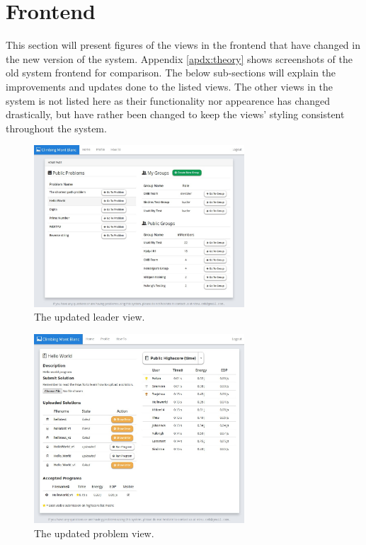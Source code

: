 \section{Frontend}
\label{sec:impr-frontend}
This section will present figures of the views in the frontend that have changed in the new version of the system. Appendix \ref{apdx:theory} shows screenshots of the old system frontend for comparison. The below sub-sections will explain the improvements and updates done to the listed views. The other views in the system is not listed here as their functionality nor appearence has changed drastically, but have rather been changed to keep the views' styling consistent throughout the system.

\begin{figure}[h!]
    \centering
    \includegraphics[width=0.7\textwidth]{figs/new_homepage.jpg}
    \caption[The updated leader view]{The updated leader view.}
    \label{fig:new-homepage}
\end{figure}

\begin{figure}[h!]
    \centering
    \includegraphics[width=0.7\textwidth]{figs/new_problem.jpg}
    \caption[The updated problem view]{The updated problem view.}
    \label{fig:new-problem}
\end{figure}

